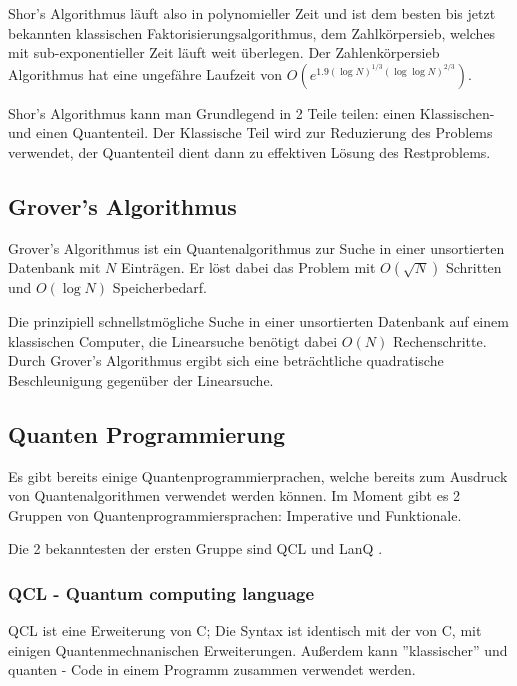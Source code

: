 Shor's Algorithmus läuft also in polynomieller Zeit und ist dem besten bis jetzt bekannten klassischen Faktorisierungsalgorithmus, dem Zahlkörpersieb, welches mit sub-exponentieller Zeit läuft weit überlegen.
Der Zahlenkörpersieb Algorithmus hat eine ungefähre Laufzeit von $O(e^{1.9 (\log{N})^{1/3} (\log{\log{N}})^{2/3}})$. \cite{numberfieldsieve}


Shor's Algorithmus kann man Grundlegend in 2 Teile teilen: einen Klassischen- und einen Quantenteil.
Der Klassische Teil wird zur Reduzierung des Problems verwendet, der Quantenteil dient dann zu effektiven Lösung des Restproblems.


\subsection{Grover's Algorithmus}
\label{sec:Grover's Algorithmus}

Grover's Algorithmus ist ein Quantenalgorithmus zur Suche in einer unsortierten Datenbank mit $N$ Einträgen. Er löst dabei das Problem mit $O(\sqrt{N})$ Schritten und $O(\log N)$ Speicherbedarf.

Die prinzipiell schnellstmögliche Suche in einer unsortierten Datenbank auf einem klassischen Computer, die Linearsuche benötigt dabei $O(N)$ Rechenschritte.
Durch Grover's Algorithmus ergibt sich eine beträchtliche quadratische Beschleunigung gegenüber der Linearsuche.


\subsection{Quanten Programmierung}
\label{sec:Quanten Programmierung}

Es gibt bereits einige Quantenprogrammierprachen, welche bereits zum Ausdruck von Quantenalgorithmen verwendet werden können.
Im Moment gibt es 2 Gruppen von Quantenprogrammiersprachen: Imperative und Funktionale.

Die 2 bekanntesten der ersten Gruppe sind QCL \cite{qcl} und LanQ \cite{lanq}.


\subsubsection{QCL - Quantum computing language}
\label{sec:QCL - Quantum computing language}

QCL ist eine Erweiterung von C; Die Syntax ist identisch mit der von C, mit einigen Quantenmechnanischen Erweiterungen.
Außerdem kann ''klassischer'' und quanten - Code in einem Programm zusammen verwendet werden.

